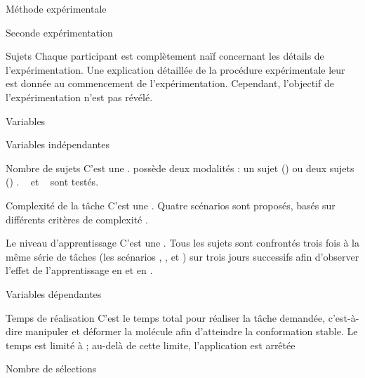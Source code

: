 \documentclass[myfrancais,ngerman,english,french]{mythesis}
\begin{document}
\begin{mychapter}{Méthode expérimentale}
\begin{mysection}{Seconde expérimentation}
\begin{mysubsection}{Sujets}
				Chaque participant est complètement naïf concernant les détails de l'expérimentation.
				Une explication détaillée de la procédure expérimentale leur est donnée au commencement de l'expérimentation.
				Cependant, l'objectif de l'expérimentation n'est pas révélé.
			\end{mysubsection}
			\begin{mysubsection}{Variables}
				\begin{mysubsubsection}{Variables indépendantes}
					\begin{myparagraph}{ Nombre de sujets}
						C'est une .
						 possède deux modalités : \og un sujet (\mycf {}) \fg ou \og deux sujets (\mycf {}) \fg.
						\mynum{12}~ et ~ sont testés.
					\end{myparagraph}
					\begin{myparagraph}{ Complexité de la tâche}
						C'est une .
						Quatre scénarios sont proposés, basés sur différents critères de complexité .
					\end{myparagraph}
					\begin{myparagraph}{ Le niveau d'apprentissage}
						C'est une .
						Tous les sujets sont confrontés trois fois à la même série de tâches (les scénarios , ,  et ) sur trois jours successifs afin d'observer l'effet de l'apprentissage en  et en .
					\end{myparagraph}
				\end{mysubsubsection}
				\begin{mysubsubsection}{Variables dépendantes}
					\begin{myparagraph}{ Temps de réalisation}
						C'est le temps total pour réaliser la tâche demandée, c'est-à-dire manipuler et déformer la molécule afin d'atteindre la conformation stable.
						Le temps est limité à ; au-delà de cette limite, l'application est arrêtée
					\end{myparagraph}
					\begin{myparagraph}{ Nombre de sélections}

\end{myparagraph}
\end{mysubsubsection}
\end{mysubsection}
\end{mysection}
\end{mychapter}
\end{document}
